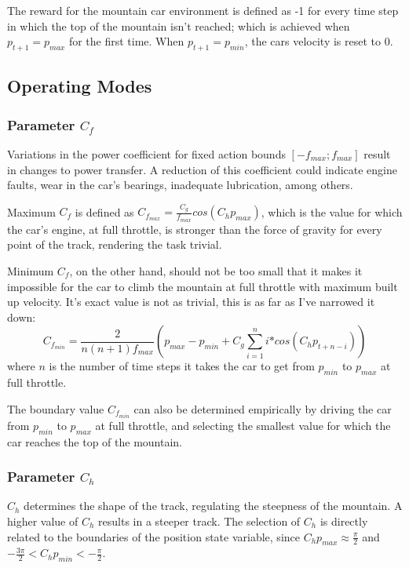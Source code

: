 \documentclass{article}
\begin{document}
The reward for the mountain car environment is defined as -1 for every time step in which the top of the mountain isn't reached; which is achieved when $p_{t+1} = p_{max}$ for the first time. When $p_{t+1} = p_{min}$, the cars velocity is reset to $0$.

\subsection{Operating Modes}
\subsubsection{Parameter $C_f$}
Variations in the power coefficient for fixed action bounds $[-f_{max}; f_{max}]$ result in changes to power transfer. A reduction of this coefficient could indicate engine faults, wear in the car's bearings, inadequate lubrication, among others.

Maximum $C_f$ is defined as $C_{f_{max}} = \frac{C_g}{f_{max}} cos(C_h p_{max})$, which is the value for which the car's engine, at full throttle, is stronger than the force of gravity for every point of the track, rendering the task trivial.

Minimum $C_f$, on the other hand, should not be too small that it makes it impossible for the car to climb the mountain at full throttle with maximum built up velocity. It's exact value is not as trivial, this is as far as I've narrowed it down:
\begin{equation}
C_{f_{min}} = \frac{2}{n(n+1)f_{max}}(p_{max} - p_{min} + C_g \sum_{i = 1}^n i\text{*} cos(C_h p_{t+n-i}))
\end{equation}
where $n$ is the number of time steps it takes the car to get from $p_{min}$ to $p_{max}$ at full throttle.

The boundary value $C_{f_{min}}$ can also be determined empirically by driving the car from $p_{min}$ to $p_{max}$ at full throttle, and selecting the smallest value for which the car reaches the top of the mountain.

\subsubsection{Parameter $C_h$}
$C_h$ determines the shape of the track, regulating the steepness of the mountain. A higher value of $C_h$ results in a steeper track. The selection of $C_h$ is directly related to the boundaries of the position state variable, since $C_h p_{max} \approx \frac{\pi}{2}$ and $-\frac{3\pi}{2} < C_h p_{min} <  -\frac{\pi}{2}$.
\end{document}
